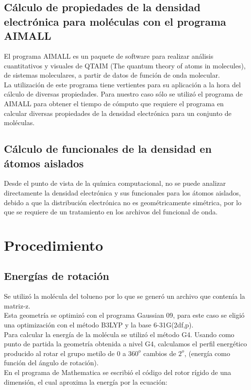 \documentclass[12pt,letterpaper]{article}
\begin{document}
\subsection{Cálculo de propiedades de la densidad electrónica para moléculas con el programa AIMALL}
El programa AIMALL es un paquete de software para realizar análisis cuantitativos y visuales de QTAIM (The quantum theory of atoms in molecules), de sistemas moleculares, a partir de datos de función de onda molecular.\\
La utilización de este programa tiene vertientes para su aplicación a la hora del cálculo de diversas propiedades. Para nuestro caso sólo se utilizó el programa de AIMALL para obtener el tiempo de cómputo que requiere el programa en calcular diversas propiedades de la densidad electrónica para un conjunto de moléculas. 


\subsection{Cálculo de funcionales de la densidad en átomos aislados}
Desde el punto de vista de la química computacional, no se puede analizar directamente la densidad electrónica y sus funcionales para los átomos aislados, debido a que la distribución electrónica no es geométricamente simétrica, por lo que se requiere de un tratamiento en los archivos del funcional de onda. 

\section{Procedimiento}
\subsection{Energías de rotación}
Se utilizó la molécula del tolueno por lo que se generó un archivo que contenía la matriz-z.\\
Esta geometría se optimizó con el programa Gaussian 09, para este caso se eligió una optimización con el método B3LYP y la base 6-31G(2df,p).\\
Para calcular la energía de la molécula se utilizó el método G4. Usando como punto de partida la geometría obtenida a nivel G4, calculamos el perfil energético producido al rotar el grupo metilo de $0$ a $360^o$ cambios de $2^o$, (energía como función del ángulo de rotación).
\\
En el programa de Mathematica se escribió el código del rotor rígido de una dimensión, el cual aproxima la energía por la ecuación:
\\
\end{document}

